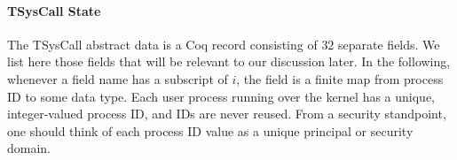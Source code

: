 \paragraph{TSysCall State}
The TSysCall abstract data is a Coq record consisting of $32$
separate fields. We list here those fields that will be
relevant to our discussion later. In the following, whenever a field 
name has a subscript of $i$, the field is a finite map from 
process ID to some data type. Each user process running over the
kernel has a unique, integer-valued process ID, and IDs are never
reused. From a security standpoint, one should think of each process
ID value as a unique principal or security domain.

